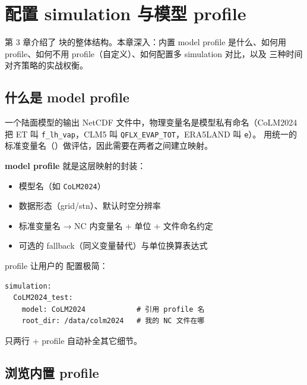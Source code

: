 
\chapter{配置 simulation 与模型 profile}

第 3 章介绍了  块的整体结构。本章深入：内置 model profile 是什么、如何用 profile、如何不用 profile（自定义）、如何配置多 simulation 对比，以及  三种时间对齐策略的实战权衡。

\section{什么是 model profile}

一个陆面模型的输出 NetCDF 文件中，物理变量名是模型私有命名（CoLM2024 把 ET 叫 \texttt{f\_lh\_vap}，CLM5 叫 \texttt{QFLX\_EVAP\_TOT}，ERA5LAND 叫 \texttt{e}）。\openbench{} 用统一的标准变量名（）做评估，因此需要在两者之间建立映射。

\textbf{model profile} 就是这层映射的封装：

\begin{itemize}
  \item 模型名（如 \texttt{CoLM2024}）
  \item 数据形态（grid/stn）、默认时空分辨率
  \item 标准变量名 → NC 内变量名 + 单位 + 文件命名约定
  \item 可选的 fallback（同义变量替代）与单位换算表达式
\end{itemize}

profile 让用户的  配置极简：

\begin{verbatim}
simulation:
  CoLM2024_test:
    model: CoLM2024            # 引用 profile 名
    root_dir: /data/colm2024   # 我的 NC 文件在哪
\end{verbatim}

只两行 + profile 自动补全其它细节。

\section{浏览内置 profile}

\subsection{}

